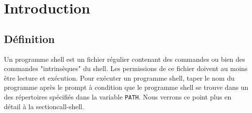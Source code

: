 %
%

\setcounter{remarque-cnt}{1}
\setcounter{example-cnt}{1}
\chapter{Introduction}

\section{D{\'e}finition}

Un programme shell est un fichier r{\'e}gulier
contenant des commandes {\Unix} ou bien des commandes
"intrins{\`e}ques" du shell. Les permissions de ce fichier doivent
au moins {\^e}tre lecture et ex{\'e}cution. Pour ex{\'e}cuter un
programme shell, taper le nom du programme apr{\`e}s le prompt {\`a}
condition que le programme shell se trouve dans un des r{\'e}pertoires
sp{\'e}cifi{\'e}s dans la variable 
\texttt{PATH}. Nous verrons ce point plus en d{\'e}tail {\`a} la
section{call-shell}.

